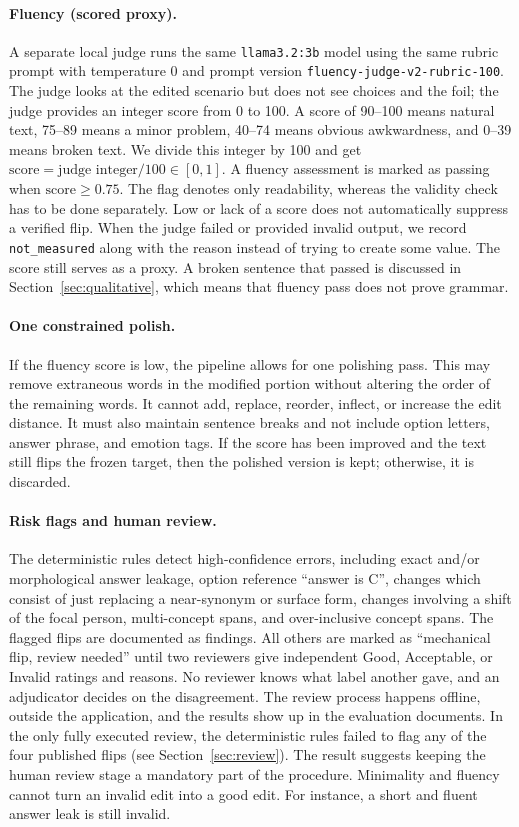 \documentclass[11pt,a4paper]{article}
\begin{document}
\paragraph{Fluency (scored proxy).}
A separate local judge runs the same \texttt{llama3.2:3b} model using the
same rubric prompt with temperature 0 and prompt version
\texttt{fluency-judge-v2-rubric-100}. The judge looks at the edited scenario but does not see
choices and the foil; the judge provides an integer score from 0 to 100. A score of 90--100
means natural text, 75--89 means a minor problem, 40--74 means obvious awkwardness, and
0--39 means broken text. We divide this integer by 100 and get $\text{score} = \text{judge
integer} / 100 \in [0,1]$. A fluency assessment is marked as passing when
$\text{score} \ge 0.75$. The flag denotes
only readability, whereas the validity check has to be done separately. Low or lack of a score
does not automatically suppress a verified flip. When the judge failed or provided invalid output,
we record \texttt{not\_measured} along with the reason instead of trying to create some value.
The score still serves as a proxy. A broken sentence that passed is discussed in
Section~\ref{sec:qualitative}, which means that fluency pass does not prove grammar.

\paragraph{One constrained polish.}
If the fluency score is low, the pipeline allows for one polishing pass.
This may remove extraneous words in the modified portion without altering the order
of the remaining words. It cannot add, replace, reorder, inflect, or increase the edit
distance. It must also maintain sentence breaks and not include option letters,
answer phrase, and emotion tags. If the score has been improved and the text still flips
the frozen target, then the polished version is kept; otherwise, it is discarded.

\paragraph{Risk flags and human review.}
The deterministic rules detect high-confidence errors, including exact and/or
morphological answer leakage, option reference ``answer is C'', changes which consist
of just replacing a near-synonym or surface form, changes involving a shift of the
focal person, multi-concept spans, and over-inclusive concept spans. The flagged flips are documented as findings. All others are
marked as ``mechanical flip, review needed'' until two reviewers give independent
Good, Acceptable, or Invalid ratings and reasons. No reviewer knows what label another gave, and an adjudicator decides on the disagreement.
The review process happens offline, outside the application, and the results show up in the evaluation documents. In the only fully executed
review, the deterministic rules failed to flag any of the four published flips (see Section~\ref{sec:review}). The result suggests keeping the
human review stage a mandatory part of the procedure. Minimality and fluency cannot turn an invalid edit into a good edit. For instance,
a short and fluent answer leak is still invalid.
\end{document}
